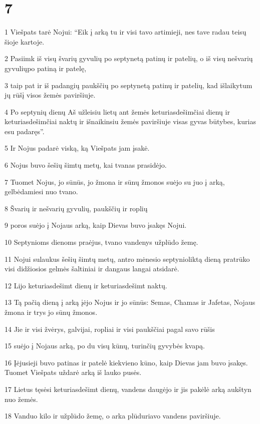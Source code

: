 \chapter{7}


\par 1 Viešpats tarė Nojui: “Eik į arką tu ir visi tavo artimieji, nes tave radau teisų šioje kartoje. 
\par 2 Pasiimk iš visų švarių gyvulių po septynetą patinų ir patelių, o iš visų nešvarių gyvulių­po patiną ir patelę, 
\par 3 taip pat ir iš padangių paukščių po septynetą patinų ir patelių, kad išlaikytum jų rūšį visos žemės paviršiuje. 
\par 4 Po septynių dienų Aš užleisiu lietų ant žemės keturiasdešimčiai dienų ir keturiasdešimčiai naktų ir išnaikinsiu žemės paviršiuje visas gyvas būtybes, kurias esu padaręs”. 
\par 5 Ir Nojus padarė viską, ką Viešpats jam įsakė. 
\par 6 Nojus buvo šešių šimtų metų, kai tvanas prasidėjo. 
\par 7 Tuomet Nojus, jo sūnūs, jo žmona ir sūnų žmonos suėjo su juo į arką, gelbėdamiesi nuo tvano. 
\par 8 Švarių ir nešvarių gyvulių, paukščių ir roplių 
\par 9 poros suėjo į Nojaus arką, kaip Dievas buvo įsakęs Nojui. 
\par 10 Septynioms dienoms praėjus, tvano vandenys užplūdo žemę. 
\par 11 Nojui sulaukus šešių šimtų metų, antro mėnesio septynioliktą dieną pratrūko visi didžiosios gelmės šaltiniai ir dangaus langai atsidarė. 
\par 12 Lijo keturiasdešimt dienų ir keturiasdešimt naktų. 
\par 13 Tą pačią dieną į arką įėjo Nojus ir jo sūnūs: Semas, Chamas ir Jafetas, Nojaus žmona ir trys jo sūnų žmonos. 
\par 14 Jie ir visi žvėrys, galvijai, ropliai ir visi paukščiai pagal savo rūšis 
\par 15 suėjo į Nojaus arką, po du visų kūnų, turinčių gyvybės kvapą. 
\par 16 Įėjusieji buvo patinas ir patelė kiekvieno kūno, kaip Dievas jam buvo įsakęs. Tuomet Viešpats uždarė arką iš lauko pusės. 
\par 17 Lietus tęsėsi keturiasdešimt dienų, vandens daugėjo ir jis pakėlė arką aukštyn nuo žemės. 
\par 18 Vanduo kilo ir užplūdo žemę, o arka plūduriavo vandens paviršiuje. 
